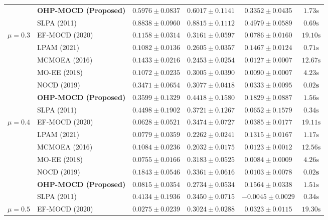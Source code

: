 \documentclass{svproc}
\begin{document}
\begin{table}[t]
{\begin{tabular}{@{}clcccc@{}}
 & \textbf{OHP-MOCD (Proposed)} & $0.5976 \pm 0.0837$ & $0.6017 \pm 0.1141$ & $0.3352 \pm 0.0435$ & $1.73\text{s}$ \\
 & SLPA (2011) & $\mathbf{0.8838 \pm 0.0960}$ & $\mathbf{0.8815 \pm 0.1112}$ & $\mathbf{0.4979 \pm 0.0589}$ & $0.69\text{s}$ \\
\midrule
$\mu = 0.3$ & EF-MOCD (2020) & $0.1158 \pm 0.0314$ & $0.3161 \pm 0.0597$ & $0.0786 \pm 0.0160$ & $19.10\text{s}$ \\
 & LPAM (2021) & $0.1082 \pm 0.0136$ & $0.2605 \pm 0.0357$ & $0.1467 \pm 0.0124$ & $0.71\text{s}$ \\
 & MCMOEA (2016) & $0.1433 \pm 0.0216$ & $0.2453 \pm 0.0254$ & $0.0127 \pm 0.0007$ & $12.67\text{s}$ \\
 & MO-EE (2018) & $0.1072 \pm 0.0235$ & $0.3005 \pm 0.0390$ & $0.0090 \pm 0.0007$ & $4.23\text{s}$ \\
 & NOCD (2019) & $0.3471 \pm 0.0654$ & $0.3077 \pm 0.0418$ & $0.0333 \pm 0.0095$ & $\mathbf{0.02\text{s}}$ \\
 & \textbf{OHP-MOCD (Proposed)} & $0.3599 \pm 0.1329$ & $\mathbf{0.4418 \pm 0.1580}$ & $\mathbf{0.1829 \pm 0.0887}$ & $1.56\text{s}$ \\
 & SLPA (2011) & $\mathbf{0.4498 \pm 0.1902}$ & $0.3721 \pm 0.1267$ & $0.0652 \pm 0.1579$ & $0.34\text{s}$ \\
\midrule
$\mu = 0.4$ & EF-MOCD (2020) & $0.0628 \pm 0.0521$ & $\mathbf{0.3474 \pm 0.0727}$ & $0.0385 \pm 0.0177$ & $19.11\text{s}$ \\
 & LPAM (2021) & $0.0779 \pm 0.0359$ & $0.2262 \pm 0.0241$ & $0.1315 \pm 0.0167$ & $1.17\text{s}$ \\
 & MCMOEA (2016) & $0.1084 \pm 0.0236$ & $0.2032 \pm 0.0175$ & $0.0123 \pm 0.0012$ & $12.56\text{s}$ \\
 & MO-EE (2018) & $0.0755 \pm 0.0166$ & $0.3183 \pm 0.0525$ & $0.0084 \pm 0.0009$ & $4.26\text{s}$ \\
 & NOCD (2019) & $0.1843 \pm 0.0546$ & $0.3361 \pm 0.0616$ & $0.0103 \pm 0.0078$ & $\mathbf{0.02\text{s}}$ \\
 & \textbf{OHP-MOCD (Proposed)} & $0.0815 \pm 0.0354$ & $0.2734 \pm 0.0534$ & $\mathbf{0.1564 \pm 0.0338}$ & $1.51\text{s}$ \\
 & SLPA (2011) & $\mathbf{0.4134 \pm 0.1936}$ & $0.3450 \pm 0.0715$ & $-0.0045 \pm 0.0029$ & $0.34\text{s}$ \\
\midrule
$\mu = 0.5$ & EF-MOCD (2020) & $0.0275 \pm 0.0239$ & $0.3024 \pm 0.0288$ & $0.0323 \pm 0.0115$ & $19.30\text{s}$ \\

\end{tabular}}
\end{table}
\end{document}
